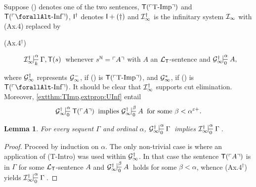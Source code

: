 \documentclass[UKenglish,cleveref,DIV=12]{scrartcl}
\let\forall\forallAlt
\newtheorem{lemma}{Lemma}
\theoremstyle{definition}
\theoremstyle{definition}
\begin{document}
Suppose (\dag) denotes one of the two sentences, $\mathsf{T}(\ulcorner{\text{T-Imp}}\urcorner)$ and $\T(\gn{\text{$\forall$-Inf}})$, $\mathsf{I}^\dag$ denotes $\mathsf{I}+(\dag)$ and $\mathcal{I}_\infty^\dag$ is the infinitary system $\mathcal{I}_\infty$ with (Ax.4) replaced by
\begin{description}
  \item[\normalfont(Ax.4$^\dag$)] $\Iinfty^\dag\prov\alpha k{\Gamma,\T(s)}$ whenever $s^{\mathbb N}=\ulcorner{A}\urcorner$ with $A$ an $\mathcal{L}_{\mathsf{T}}$-sentence and $\Ginfty^\dag\prov\alpha0{A,}$
\end{description}
where $\mathcal{G}_\infty^\dag$ represents $\mathcal{G}_\infty^-$, if (\dag) is
$\mathsf{T}(\ulcorner{\text{T-Imp}}\urcorner)$, and $\mathcal{G}_\infty^*$, if (\dag) is
$\T(\gn{\text{$\forall$-Inf}})$.
It should be clear that $\mathcal{I}_\infty^\dag$ supports cut elimination. Moreover,
\cref{extthm:TImp,extprop:UInf} entail
\begin{align}\label{exteqn:G8-TElim}
  \text{$\Ginfty^\dag\prov\alpha0{\T(\gn{A})}$ implies $\Ginfty^\dag\prov\beta0A$
  for some $\beta<\alpha^{\varepsilon+}$.}
\end{align}
\begin{lemma}\label{extpropIdagG8}
 For every sequent $\Gamma$ and ordinal $\alpha$, $\Ginfty^\dag\prov\alpha0\Gamma$ implies $\Iinfty^\dag\prov\alpha0\Gamma$.
\end{lemma}
\begin{proof}
Proceed by induction on $\alpha$. The only non-trivial case is where an
application of (T-Intro) was used within $\mathcal{G}_\infty^\dag$. In that case the sentence
$\mathsf{T}(\ulcorner{A}\urcorner)$ is in $\Gamma$ for some $\mathcal{L}_{\mathsf{T}}$-sentence $A$ and $\Ginfty^\dag\prov\beta0A$ holds
for some $\beta<\alpha$, whence (Ax.4$^\dag$) yields $\Iinfty^\dag\prov\alpha0\Gamma$.
\end{proof}
\end{document}
